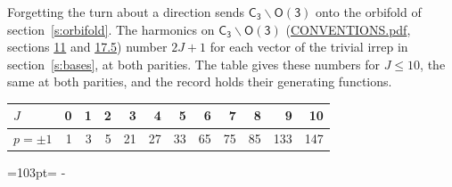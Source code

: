 \documentclass[10pt,a4paper]{article}
\newcommand{\needspace}[1]{\par\penalty-100\begingroup\dimen0=#1\relax\dimen2=\pagegoal
  \advance\dimen2-\pagetotal\ifdim\dimen0>\dimen2\relax\ifdim\dimen2>0pt\vfil\break\fi\fi
  \endgroup}
\numberwithin{equation}{section}
\newcommand{\grp}[1]{\mathsf{#1}}
\begin{document}
Forgetting the turn about a direction sends $\grp{C_{3}}\backslash\grp{O(3)}$ onto the orbifold of section~\ref{s:orbifold}.
The harmonics on $\grp{C_{3}}\backslash\grp{O(3)}$ (\href{../../CONVENTIONS.pdf}{CONVENTIONS.pdf}, sections \href{../../CONVENTIONS.pdf\#conv.11}{11} and \href{../../CONVENTIONS.pdf\#conv.17.5}{17.5}) number $2J + 1$ for each vector of the trivial irrep in section~\ref{s:bases}, at both parities. The table gives these numbers for $J \le 10$, the same at both parities, and the record holds their generating functions.
{\small\setlength{\tabcolsep}{4pt}\begin{longtable}{@{}lrrrrrrrrrrr@{}}\toprule
$J$ & 0 & 1 & 2 & 3 & 4 & 5 & 6 & 7 & 8 & 9 & 10\\\midrule\endhead
\bottomrule\endfoot\endlastfoot
$p = \pm 1$ & 1 & 3 & 5 & 21 & 27 & 33 & 65 & 75 & 85 & 133 & 147\\
\bottomrule\end{longtable}}
\needspace{103pt}
\end{document}
